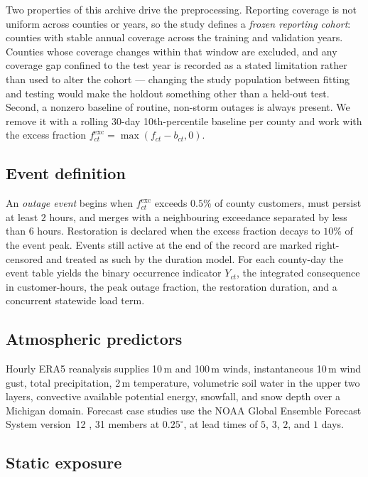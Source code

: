 \documentclass[10pt,twocolumn,letterpaper]{article}
\newcommand{\CH}{customer-hours}
\begin{document}
Two properties of this archive drive the preprocessing. Reporting coverage is
not uniform across counties or years, so the study defines a \emph{frozen
reporting cohort}: counties with stable annual coverage across the training and
validation years. Counties whose coverage changes within that window are
excluded, and any coverage gap confined to the test year is recorded as a stated
limitation rather than used to alter the cohort --- changing the study population
between fitting and testing would make the holdout something other than a
held-out test. Second, a nonzero baseline of routine, non-storm outages is
always present. We remove it with a rolling 30-day 10th-percentile baseline per
county and work with the excess fraction
$f^{\mathrm{exc}}_{ct}=\max(f_{ct}-b_{ct},0)$.

\subsection{Event definition}

An \emph{outage event} begins when $f^{\mathrm{exc}}_{ct}$ exceeds
$0.5\%$ of county customers, must persist at least $2$ hours, and merges with a
neighbouring exceedance separated by less than $6$ hours. Restoration is
declared when the excess fraction decays to $10\%$ of the event peak. Events
still active at the end of the record are marked right-censored and treated as
such by the duration model. For each county-day the event table yields the
binary occurrence indicator $Y_{ct}$, the integrated consequence in \CH{}, the
peak outage fraction, the restoration duration, and a concurrent statewide load
term.

\subsection{Atmospheric predictors}

Hourly ERA5 reanalysis \citep{hersbach2020era5} supplies 10\,m and 100\,m winds,
instantaneous 10\,m wind gust, total precipitation, 2\,m temperature,
volumetric soil water in the upper two layers, convective available potential
energy, snowfall, and snow depth over a Michigan domain. Forecast case studies
use the NOAA Global Ensemble Forecast System version~12
\citep{zhou2022gefsv12}, 31 members at $0.25^\circ$, at lead times of
$5$, $3$, $2$, and $1$ days.

\subsection{Static exposure}
\end{document}
